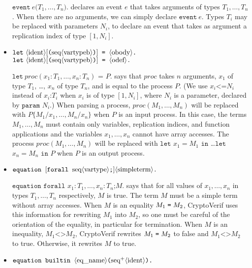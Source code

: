 \begin{itemize}
$\texttt{event}\ e\texttt{(}T_1, \ldots, T_n\texttt{)}\texttt{.}$
declares an event $e$ that takes arguments of types $T_1, \ldots, T_n$.
When there are no arguments, we can simply declare 
$\texttt{event}\ e\texttt{.}$ Types $T_i$ may be replaced with
parameters $N_i$, to declare an event that takes as argument
a replication index of type $[1,N_i]$.


\item $\texttt{let}\ \nonterm{ident}[\texttt{(}\seq{vartypeb}\texttt{)}]\texttt{ = }\oprocess\texttt{.}$\\
$\texttt{let}\ \nonterm{ident}[\texttt{(}\seq{vartypeb}\texttt{)}]\texttt{ = }\iprocess\texttt{.}$

$\texttt{let}\ \mathit{proc}(x_1:T_1, \dots, x_n:T_n)\texttt{ = }P\texttt{.}$ says that $\mathit{proc}$ takes $n$ arguments, $x_1$ of type $T_1$, \dots, $x_n$ of type $T_n$, and is equal to the process
$P$. (We use $x_i \texttt{<=} N_i$ instead of
  $x_i\texttt{:} T_i$ when $x_i$ is of type $[1,N_i]$, where $N_i$ is
  a parameter, declared by $\texttt{param }N_i$.)
When parsing a process, $\mathit{proc}(M_1, \dots, M_n)$ will be replaced with $P\{M_1/x_1, \dots, M_n/x_n\}$ when $P$ is an input process. In this case, the terms $M_1, \dots, M_n$ must contain only variables, replication indices, and function applications and the variables $x_1, \dots, x_n$ cannot have array accesses.
The process $\mathit{proc}(M_1, \dots, M_n)$ will be replaced with $\texttt{let}$ $x_1 = M_1$ $\texttt{in}$ \dots $\texttt{let}$ $x_n = M_n$ $\texttt{in}$ $P$ when $P$ is an output process.

\item $\texttt{equation }[\texttt{forall }\textrm{seq}\langle\textrm{vartype}\rangle\texttt{;}]\langle\textrm{simpleterm}\rangle\texttt{.}$

$\texttt{equation forall }x_1:T_1, \ldots, x_n:T_n\texttt{;}M\texttt{.}$ says
that for all values of $x_1, \ldots, x_n$ in types $T_1, \ldots, T_n$
respectively,
$M$ is true. The term $M$ must be a simple term without array accesses.
%
When $M$ is an equality $M_1 \mathrel{\texttt{=}}  M_2$, CryptoVerif uses this information
for rewriting $M_1$ into $M_2$, so one must be careful of the orientation
of the equality, in particular for termination.
%
When $M$ is an inequality, $M_1 \texttt{<>} M_2$, CryptoVerif rewrites
$M_1 \mathrel{\texttt{=}}  M_2$ to false and $M_1 \texttt{<>} M_2$ to true.
%
Otherwise, it rewrites $M$ to true.

\item $\texttt{equation builtin }\langle\textrm{eq\_name}\rangle\texttt{(}\textrm{seq}^+\langle\textrm{ident}\rangle\texttt{).}$


\end{itemize}

